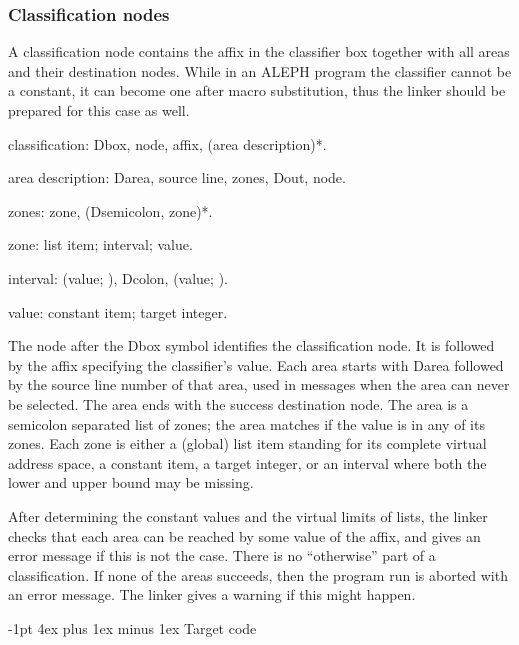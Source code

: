 \documentclass[titlepage]{article}
\makeatletter
\newcommand\A{\textsf{ALEPH}}
\newenvironment{grammar}{%
\begin{list}{}{%
\setlength\leftmargin{18pt}%
\setlength\rightmargin{-5pt}%
\setlength\listparindent{20pt}%
\setlength\itemsep{1pt plus0.2ex}%
\setlength\parsep{0pt plus 2pt}%
\setlength\labelsep{-5pt}%
}\color{blue!90!black}\sf\mkoptions%
}{\end{list}}
\newcommand\g[1]{\textsf{\color{blue!90!black}#1}}
\renewcommand\section{%
\newpage
\@startsection{section}{1}{\z@}%
   {-1pt}%
   {4ex plus 1ex minus 1ex}%
   {\normalfont\Large\bfseries}}
\let\osection\section
\def\section {\newpage\osection}
\makeatother
\begin{document}
\subsubsection{Classification nodes}

A classification node contains the affix in the classifier box together with
all areas and their destination nodes. While in an \A{} program the classifier
cannot be a constant, it can become one after macro substitution, thus the
linker should be prepared for this case as well.
\begin{grammar}
\item classification: Dbox, node, affix, (area description)*.
\item area description: Darea, source line, zones, Dout, node.
\item zones: zone, (Dsemicolon, zone)*.
\item zone: list item; interval; value.
\item interval: (value; ), Dcolon, (value; ).
\item value: constant item; target integer.
\end{grammar}
The \g{node} after the \g{Dbox} symbol identifies the classification node.
It is followed by the affix specifying the classifier's value. Each area
starts with \g{Darea} followed by the source line number of that area,
used in messages when the area can never be selected. The
area ends with the success destination node. The area is a semicolon
separated list of \g{zone}s; the area matches if the value is in any of its zones.
Each \g{zone} is either a (global) list item standing for its complete
virtual address space, a constant item, a target integer, or an \g{interval}
where both the lower and upper bound may be missing.

After determining the constant values and the virtual limits of lists, the
linker checks that each area can be reached by some value of the \g{affix},
and gives an error message if this is not the case. There is no
``otherwise'' part of a classification. If none of the areas succeeds, then
the program run is aborted with an error message. The linker gives a warning
if this might happen.





\section{Target code}
\end{document}
